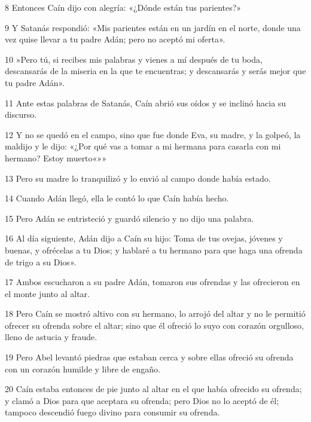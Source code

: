 \par 8 Entonces Caín dijo con alegría: «¿Dónde están tus parientes?»

\par 9 Y Satanás respondió: «Mis parientes están en un jardín en el norte, donde una vez quise llevar a tu padre Adán; pero no aceptó mi oferta».

\par 10 »Pero tú, si recibes mis palabras y vienes a mí después de tu boda, descansarás de la miseria en la que te encuentras; y descansarás y serás mejor que tu padre Adán».

\par 11 Ante estas palabras de Satanás, Caín abrió sus oídos y se inclinó hacia su discurso.

\par 12 Y no se quedó en el campo, sino que fue donde Eva, su madre, y la golpeó, la maldijo y le dijo: «¿Por qué vas a tomar a mi hermana para casarla con mi hermano? Estoy muerto«»»

\par 13 Pero su madre lo tranquilizó y lo envió al campo donde había estado.

\par 14 Cuando Adán llegó, ella le contó lo que Caín había hecho.

\par 15 Pero Adán se entristeció y guardó silencio y no dijo una palabra.

\par 16 Al día siguiente, Adán dijo a Caín su hijo: Toma de tus ovejas, jóvenes y buenas, y ofrécelas a tu Dios; y hablaré a tu hermano para que haga una ofrenda de trigo a su Dios».

\par 17 Ambos escucharon a su padre Adán, tomaron sus ofrendas y las ofrecieron en el monte junto al altar.

\par 18 Pero Caín se mostró altivo con su hermano, lo arrojó del altar y no le permitió ofrecer su ofrenda sobre el altar; sino que él ofreció lo suyo con corazón orgulloso, lleno de astucia y fraude.

\par 19 Pero Abel levantó piedras que estaban cerca y sobre ellas ofreció su ofrenda con un corazón humilde y libre de engaño.

\par 20 Caín estaba entonces de pie junto al altar en el que había ofrecido su ofrenda; y clamó a Dios para que aceptara su ofrenda; pero Dios no lo aceptó de él; tampoco descendió fuego divino para consumir su ofrenda.

